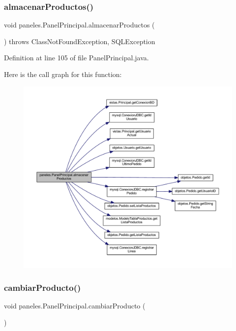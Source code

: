 \subsubsection{\texorpdfstring{almacenar\+Productos()}{almacenarProductos()}}
{\footnotesize\ttfamily void paneles.\+Panel\+Principal.\+almacenar\+Productos (\begin{DoxyParamCaption}{ }\end{DoxyParamCaption}) throws Class\+Not\+Found\+Exception, S\+Q\+L\+Exception}



Definition at line 105 of file Panel\+Principal.\+java.

Here is the call graph for this function\+:\nopagebreak
\begin{figure}[H]
\begin{center}
\leavevmode
\includegraphics[width=350pt]{classpaneles_1_1_panel_principal_ad46c27384163d0757eadfe86cf72ee70_cgraph}
\end{center}
\end{figure}
\mbox{\label{classpaneles_1_1_panel_principal_aa2151461e479985277d05375c02b1022}} 
\subsubsection{\texorpdfstring{cambiar\+Producto()}{cambiarProducto()}}
{\footnotesize\ttfamily void paneles.\+Panel\+Principal.\+cambiar\+Producto (\begin{DoxyParamCaption}{ }\end{DoxyParamCaption})}




